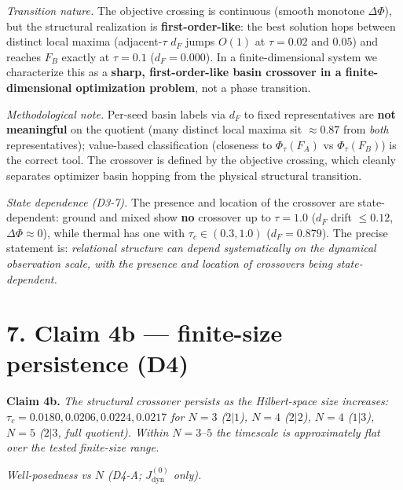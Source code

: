 \documentclass[
]{article}
\begin{document}
\emph{Transition nature.} The objective crossing is continuous (smooth
monotone \(\Delta\Phi\)), but the structural realization is
\textbf{first-order-like}: the best solution hops between distinct local
maxima (adjacent-\(\tau\) \(d_F\) jumps \(O(1)\) at \(\tau=0.02\) and
\(0.05\)) and reaches \(F_B\) exactly at \(\tau=0.1\) (\(d_F=0.000\)).
In a finite-dimensional system we characterize this as a \textbf{sharp,
first-order-like basin crossover in a finite-dimensional optimization
problem}, not a phase transition.

\emph{Methodological note.} Per-seed basin labels via \(d_F\) to fixed
representatives are \textbf{not meaningful} on the quotient (many
distinct local maxima sit \(\approx 0.87\) from \emph{both}
representatives); value-based classification (closeness to
\(\Phi_\tau(F_A)\) vs \(\Phi_\tau(F_B)\)) is the correct tool. The
crossover is defined by the objective crossing, which cleanly separates
optimizer basin hopping from the physical structural transition.

\emph{State dependence (D3-7).} The presence and location of the
crossover are state-dependent: ground and mixed show \textbf{no}
crossover up to \(\tau=1.0\) (\(d_F\) drift \(\le 0.12\),
\(\Delta\Phi \approx 0\)), while thermal has one with
\(\tau_c \in (0.3, 1.0)\) (\(d_F = 0.879\)). The precise statement is:
\emph{relational structure can depend systematically on the dynamical
observation scale, with the presence and location of crossovers being
state-dependent.}

\section{7. Claim 4b --- finite-size persistence
(D4)}\label{claim-4b-finite-size-persistence-d4}

\textbf{Claim 4b.} \emph{The structural crossover persists as the
Hilbert-space size increases:
\(\tau_c = 0.0180, 0.0206, 0.0224, 0.0217\) for \(N = 3\) (\(2|1\)),
\(N=4\) (\(2|2\)), \(N=4\) (\(1|3\)), \(N=5\) (\(2|3\), full quotient).
Within \(N=3\text{–}5\) the timescale is approximately flat over the
tested finite-size range.}

\emph{Well-posedness vs \(N\) (D4-A; \(J_{\mathrm{dyn}}^{(0)}\) only).}
\end{document}
